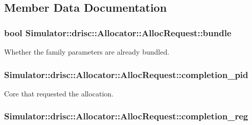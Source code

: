 \subsection{Member Data Documentation}
\hypertarget{struct_simulator_1_1drisc_1_1_allocator_1_1_alloc_request_ab75db5e75f45658a27b8c4ea89043240}{
\subsubsection[{bundle}]{\setlength{\rightskip}{0pt plus 5cm}bool Simulator\+::drisc\+::\+Allocator\+::\+Alloc\+Request\+::bundle}}\label{struct_simulator_1_1drisc_1_1_allocator_1_1_alloc_request_ab75db5e75f45658a27b8c4ea89043240}


Whether the family parameters are already bundled. 

\hypertarget{struct_simulator_1_1drisc_1_1_allocator_1_1_alloc_request_ad32cee2268de2b062c57e95e20e8fdb9}{
\subsubsection[{completion\+\_\+pid}]{ Simulator\+::drisc\+::\+Allocator\+::\+Alloc\+Request\+::completion\+\_\+pid}}\label{struct_simulator_1_1drisc_1_1_allocator_1_1_alloc_request_ad32cee2268de2b062c57e95e20e8fdb9}


Core that requested the allocation. 

\hypertarget{struct_simulator_1_1drisc_1_1_allocator_1_1_alloc_request_a7d268fde8717658ef2f26fb95e9c4786}{
\subsubsection[{completion\+\_\+reg}]{ Simulator\+::drisc\+::\+Allocator\+::\+Alloc\+Request\+::completion\+\_\+reg}}\label{struct_simulator_1_1drisc_1_1_allocator_1_1_alloc_request_a7d268fde8717658ef2f26fb95e9c4786}



